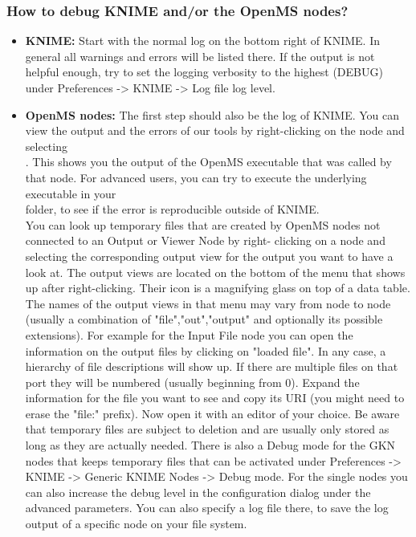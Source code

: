 \subsubsection{How to debug KNIME and/or the OpenMS nodes?}
\begin{itemize}
\item \textbf{KNIME:} Start with the normal log on the bottom right of KNIME. In general all warnings and errors will be
listed there. If the output is not helpful enough, try to set the logging verbosity to the highest (DEBUG) under
Preferences -> KNIME -> Log file log level.
\item \textbf{OpenMS nodes:} The first step should also be the log of KNIME. You can view the output and the errors of our
tools by right-clicking on the node and selecting\\
. This shows you the output of the OpenMS executable that was called by that 
node. For advanced users, you can try 
to execute the underlying executable in your\\
 folder, 
to see if the error is reproducible outside of KNIME.\\
You can look up temporary files that are created by OpenMS nodes not connected to an Output or Viewer Node by right-
clicking on a node and selecting the corresponding output view for the output you want to have a look at. The output 
views are located on the bottom of the menu that shows up after right-clicking. Their icon is a magnifying glass on 
top of a data table. The names of the output views in that menu may vary from node to node (usually a combination of 
"file","out","output" and optionally its possible extensions). For example for the Input File node you can open the 
information on the output files by clicking on "loaded file". In any case, a hierarchy of file descriptions will show 
up. If there are multiple files on that port they will be numbered (usually beginning from 0). Expand the information 
for the file you want to see and copy its URI (you might need to erase the "file:" prefix). Now open it with an 
editor of your choice. Be aware that temporary files are subject to deletion and are usually only stored as long as 
they are actually needed. There is also a Debug mode for the GKN nodes that keeps temporary files that can be activated
under Preferences -> KNIME -> Generic KNIME Nodes -> Debug mode.
For the single nodes you can also increase the debug level in the configuration dialog under the advanced parameters.
You can also specify a log file there, to save the log output of a specific node on your file system.
\end{itemize}

